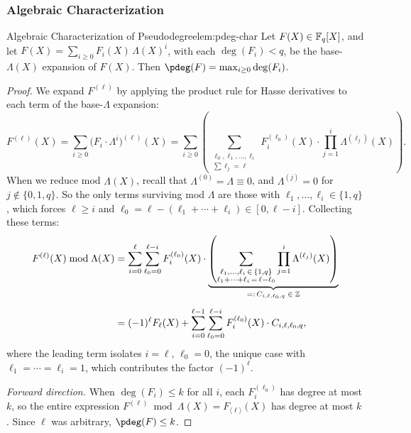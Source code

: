 \subsubsection{Algebraic Characterization}
\begin{lemma}{Algebraic Characterization of Pseudodegree}{lem:pdeg-char}
  Let $F(X) \in \mathbb{F}_q[X]$, and let $F(X) = \sum_{i \geq 0} F_i(X)\,\Lambda(X)^i$, with each $\deg(F_i) < q$, be the base-$\Lambda(X)$ expansion of $F(X)$. Then $\pdeg(F) = \max_{i \geq 0} \deg(F_i)$.
\end{lemma}

\begin{proof}
  We expand $F^{(\ell)}$ by applying the product rule for Hasse derivatives to each term of the base-$\Lambda$ expansion:
  \[
    F^{(\ell)}(X)
    = \sum_{i \geq 0} \bigl(F_i \cdot \Lambda^i\bigr)^{(\ell)}(X)
    = \sum_{i \geq 0} \left(
    \sum_{\substack{\ell_0,\ell_1,\ldots,\ell_i \\ \sum \ell_j = \ell}}
    F_i^{(\ell_0)}(X) \cdot \prod_{j=1}^{i} \Lambda^{(\ell_j)}(X)
    \right).
  \]
  When we reduce mod $\Lambda(X)$, recall that $\Lambda^{(0)} = \Lambda \equiv 0$, and $\Lambda^{(j)} = 0$ for $j \notin \{0,1,q\}$. So the only terms surviving mod $\Lambda$ are those with $\ell_1, \ldots, \ell_i \in \{1, q\}$, which forces $\ell \geq i$ and $\ell_0 = \ell - (\ell_1 + \cdots + \ell_i) \in [0, \ell - i]$. Collecting these terms:
  \begin{align*}
    F^{(\ell)}(X) \bmod \Lambda(X)
     & = \sum_{i=0}^{\ell} \sum_{\ell_0=0}^{\ell-i}
    F_i^{(\ell_0)}(X) \cdot
    \underbrace{\left(
    \sum_{\substack{\ell_1,\ldots,\ell_i\,\in\,\{1,q\} \\ \ell_1+\cdots+\ell_i\,=\,\ell-\ell_0}}
      \prod_{j=1}^{i} \Lambda^{(\ell_j)}(X)
    \right)}_{=:\,C_{i,\ell,\ell_0,q}\;\in\;\mathbb{Z}}      \\[4pt]
     & = (-1)^{\ell} F_\ell(X)
    + \sum_{i=0}^{\ell-1} \sum_{\ell_0=0}^{\ell-i}
    F_i^{(\ell_0)}(X) \cdot C_{i,\ell,\ell_0,q},
  \end{align*}
  where the leading term isolates $i = \ell,\, \ell_0 = 0$, the unique case with $\ell_1 = \cdots = \ell_i = 1$, which contributes the factor $(-1)^\ell$.

  \medskip\noindent\textit{Forward direction.} When $\deg(F_i) \leq k$ for all $i$, each $F_i^{(\ell_0)}$ has degree at most $k$, so the entire expression $F^{(\ell)} \bmod \Lambda(X) = F_{\langle\ell\rangle}(X)$ has degree at most $k$. Since $\ell$ was arbitrary, $\pdeg(F) \leq k$.


\end{proof}
